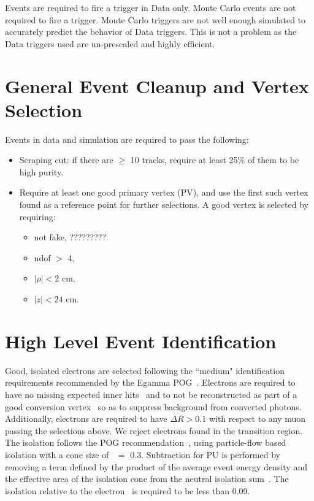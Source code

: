 Events are required to fire a trigger in Data only. Monte Carlo events are not required to fire a trigger. Monte Carlo triggers are not well enough simulated to accurately predict the behavior of Data triggers. This is not a problem as the Data triggers used are un-prescaled and highly efficient.




\section{General Event Cleanup and Vertex Selection}
\label{sec::EventCleanup}

Events in data and simulation are required to pass the following:

\begin{itemize}
\item Scraping cut: if there are $\geq$ 10 tracks, require at least 25\% of them to be high purity. 
\item Require at least one good primary vertex (PV), and use the first such vertex found as a reference point for further selections.  A good vertex is selected by requiring:
	\begin{itemize}
	\item not fake, ?????????
	\item ndof $>$ 4,
	\item $|\rho| < 2$ cm,
	\item $|z| < 24$ cm.  
	\end{itemize}
\end{itemize}
	 
	 
\section{High Level Event Identification}	 
\label{sec:EventSelections}
Good, isolated electrons are selected following the ``medium" identification requirements recommended by the Egamma POG~\cite{eleICHEP2012twiki}.
Electrons are required to have no missing expected inner hits~\cite{conv} and to not be reconstructed as part of a good conversion vertex~\cite{hwwsmurf} so as to suppress background from converted photons.
Additionally, electrons are required to have $\Delta R >0.1$ with respect to any muon passing the selections above.
We reject electrons found in the transition region.
The isolation follows the POG recommendation~\cite{egammapfisotwiki}, using particle-flow based isolation with a cone size of \DR\  $=$ 0.3.  
Subtraction for PU is performed by removing a term defined by the product of the average event energy density and the effective area of the isolation cone from the neutral isolation sum~\cite{egammaisorhoaeff}.
The isolation relative to the electron \pt\ is required to be less than 0.09.\\


